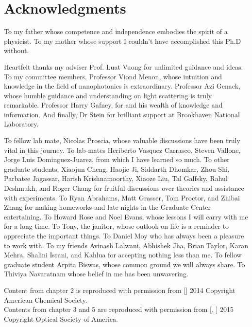 \nobibliography*
\chapter*{Acknowledgments}

To my father whose competence and independence embodies the spirit of a physicist. To my mother whose support I couldn't have accomplished this Ph.D without.

Heartfelt thanks my adviser Prof. Luat Vuong for unlimited guidance and ideas.
To my committee members. Professor Viond Menon, whose intuition and knowledge in the field of nanophotonics is extraordinary.
Professor Azi Genack, whose humble guidance and understanding on light scattering is truly remarkable.
Professor Harry Gafney, for and his wealth of knowledge and information.
And finally, Dr Stein for brilliant support at Brookhaven National Laboratory. 

To fellow lab mate, Nicolas Proscia, whose valuable discussions have been truly vital in this journey. 
To lab-mates Heriberto Vasquez Carrasco, Steven Vallone, Jorge Luis Dominguez-Juarez, from which I have learned so much.
To other graduate students, Xiaojun Cheng, Haojie Ji, Siddarth Dhomkar, Zhou Shi, Parbatee Jagassar, Harish Krishnamoorthy, Xiaoze Liu, Tal Galfsky, Rahul Deshmukh, and Roger Chang for fruitful discussions over theories and assistance with experiments.
To Ryan Abrahams, Matt Grasser, Tom Proctor, and Zhibai Zhang for making homeworks and late nights in the Graduate Center entertaining.
To Howard Rose and Noel Evans, whose lessons I will carry with me for a long time.
To Tony, the janitor, whose outlook on life is a reminder to appreciate the important things. To Daniel Moy who has always been a pleasure to work with.
To my friends Avinash Lalwani, Abhishek Jha, Brian Taylor, Karan Mehra, Shalini Israni, and Kahlua for accepting nothing less than me.
To fellow graduate student Arpita Biswas, whose common ground we will always share.
To Thiviya Navaratnam whose belief in me has been unwavering.


Content from chapter 2 is reproduced with permission from [] 2014 Copyright American Chemical Society.\\
Contents from chapter 3 and 5 are reproduced with permission from [, ] 2015 Copyright Optical Society of America.